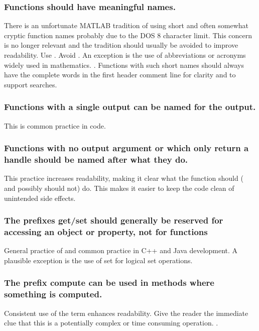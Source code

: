 \documentclass[titlepage,a4paper,12pt]{article}
\begin{document}
\subsubsection{Functions should have meaningful names.}
 There is an
unfortunate MATLAB tradition of using short and often somewhat
cryptic function names probably due to the DOS 8 character limit.
This concern is no longer relevant and the tradition should usually
be avoided to improve readability. Use
. Avoid . An
exception is the use of abbreviations or acronyms widely used in
mathematics. . Functions with such short
names should always have the complete words in the first header
comment line for clarity and to support 
searches.
\subsubsection{Functions with a single output can be named for the
output.}
 This is common practice in \TMW code. 

\subsubsection{Functions with no output argument or which only return a handle
should be named after what they do.} This practice increases
readability, making it clear what the function should ( and possibly
should not) do. This makes it easier to keep the code clean of
unintended side effects. 



\subsubsection{The prefixes get/set should generally be reserved for accessing an
object or property, not for functions} General practice of \TMW and common practice in
C++ and Java development. A plausible exception is the use of set
for logical set operations. 

\subsubsection{The prefix compute can be used in methods where something is
computed.} Consistent use of the term enhances readability. Give the
reader the immediate clue that this is a potentially complex or time
consuming operation. .
\end{document}
